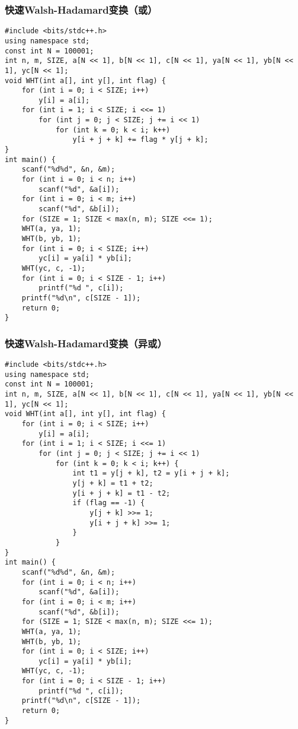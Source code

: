 ﻿\documentclass[a4paper]{article}
\begin{document}
\subsubsection{快速Walsh-Hadamard变换（或）}
\begin{lstlisting}
#include <bits/stdc++.h>
using namespace std;
const int N = 100001;
int n, m, SIZE, a[N << 1], b[N << 1], c[N << 1], ya[N << 1], yb[N << 1], yc[N << 1];
void WHT(int a[], int y[], int flag) {
    for (int i = 0; i < SIZE; i++)
        y[i] = a[i];
    for (int i = 1; i < SIZE; i <<= 1)
        for (int j = 0; j < SIZE; j += i << 1)
            for (int k = 0; k < i; k++)
                y[i + j + k] += flag * y[j + k];
}
int main() {
    scanf("%d%d", &n, &m);
    for (int i = 0; i < n; i++)
        scanf("%d", &a[i]);
    for (int i = 0; i < m; i++)
        scanf("%d", &b[i]);
    for (SIZE = 1; SIZE < max(n, m); SIZE <<= 1);
    WHT(a, ya, 1);
    WHT(b, yb, 1);
    for (int i = 0; i < SIZE; i++)
        yc[i] = ya[i] * yb[i];
    WHT(yc, c, -1);
    for (int i = 0; i < SIZE - 1; i++)
        printf("%d ", c[i]);
    printf("%d\n", c[SIZE - 1]);
    return 0;
}
\end{lstlisting}
\subsubsection{快速Walsh-Hadamard变换（异或）}
\begin{lstlisting}
#include <bits/stdc++.h>
using namespace std;
const int N = 100001;
int n, m, SIZE, a[N << 1], b[N << 1], c[N << 1], ya[N << 1], yb[N << 1], yc[N << 1];
void WHT(int a[], int y[], int flag) {
    for (int i = 0; i < SIZE; i++)
        y[i] = a[i];
    for (int i = 1; i < SIZE; i <<= 1)
        for (int j = 0; j < SIZE; j += i << 1)
            for (int k = 0; k < i; k++) {
                int t1 = y[j + k], t2 = y[i + j + k];
                y[j + k] = t1 + t2;
                y[i + j + k] = t1 - t2;
                if (flag == -1) {
                    y[j + k] >>= 1;
                    y[i + j + k] >>= 1;
                }
            }
}
int main() {
    scanf("%d%d", &n, &m);
    for (int i = 0; i < n; i++)
        scanf("%d", &a[i]);
    for (int i = 0; i < m; i++)
        scanf("%d", &b[i]);
    for (SIZE = 1; SIZE < max(n, m); SIZE <<= 1);
    WHT(a, ya, 1);
    WHT(b, yb, 1);
    for (int i = 0; i < SIZE; i++)
        yc[i] = ya[i] * yb[i];
    WHT(yc, c, -1);
    for (int i = 0; i < SIZE - 1; i++)
        printf("%d ", c[i]);
    printf("%d\n", c[SIZE - 1]);
    return 0;
}
\end{lstlisting}
\end{document}
